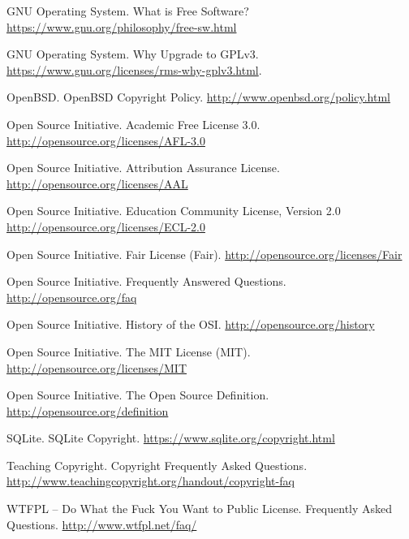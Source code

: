 \documentclass[12pt,letterpaper]{article}
\begin{document}
\begin{thebibliography}{20}
 GNU Operating System. What is Free Software? \url{https://www.gnu.org/philosophy/free-sw.html}

 GNU Operating System. Why Upgrade to GPLv3. \url{https://www.gnu.org/licenses/rms-why-gplv3.html}.

 OpenBSD. OpenBSD Copyright Policy. \url{http://www.openbsd.org/policy.html}

 Open Source Initiative. Academic Free License 3.0. \url{http://opensource.org/licenses/AFL-3.0}

 Open Source Initiative. Attribution Assurance License. \url{http://opensource.org/licenses/AAL}

 Open Source Initiative. Education Community License, Version 2.0 \url{http://opensource.org/licenses/ECL-2.0}

 Open Source Initiative. Fair License (Fair). \url{http://opensource.org/licenses/Fair}

 Open Source Initiative. Frequently Answered Questions. \url{http://opensource.org/faq}

 Open Source Initiative. History of the OSI. \url{http://opensource.org/history}

 Open Source Initiative. The MIT License (MIT). \url{http://opensource.org/licenses/MIT}

 Open Source Initiative. The Open Source Definition. \url{http://opensource.org/definition}

 SQLite. SQLite Copyright. \url{https://www.sqlite.org/copyright.html}

 Teaching Copyright. Copyright Frequently Asked Questions. \url{http://www.teachingcopyright.org/handout/copyright-faq}

 WTFPL – Do What the Fuck You Want to Public License. Frequently Asked Questions. \url{http://www.wtfpl.net/faq/}

\end{thebibliography}
\end{document}
